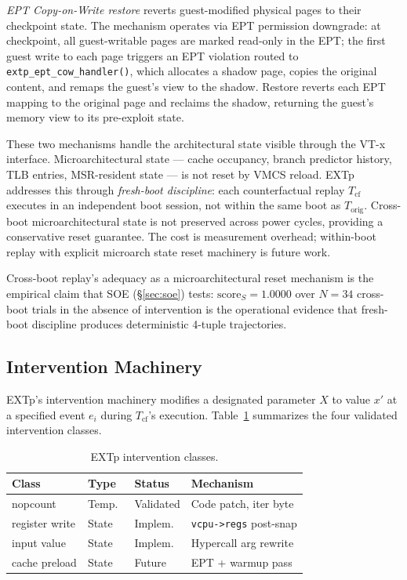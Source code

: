 \documentclass[conference]{IEEEtran}
\newcommand{\Korig}{T_\text{orig}}
\newcommand{\Tcf}{T_\text{cf}}
\newcommand{\scoreS}{\text{score}_S}
\begin{document}
\emph{EPT Copy-on-Write restore} reverts guest-modified physical
pages to their checkpoint state. The mechanism operates via EPT
permission downgrade: at checkpoint, all guest-writable pages are
marked read-only in the EPT; the first guest write to each page
triggers an EPT violation routed to
\texttt{extp\_ept\_cow\_handler()}, which allocates a shadow page,
copies the original content, and remaps the guest's view to the
shadow. Restore reverts each EPT mapping to the original page and
reclaims the shadow, returning the guest's memory view to its
pre-exploit state.

These two mechanisms handle the architectural state visible through
the VT-x interface. Microarchitectural state --- cache occupancy,
branch predictor history, TLB entries, MSR-resident state --- is not
reset by VMCS reload. EXTp addresses this through \emph{fresh-boot
discipline}: each counterfactual replay $\Tcf$ executes in an
independent boot session, not within the same boot as $\Korig$.
Cross-boot microarchitectural state is not preserved across power
cycles, providing a conservative reset guarantee. The cost is
measurement overhead; within-boot replay with explicit microarch
state reset machinery is future work.

Cross-boot replay's adequacy as a microarchitectural reset mechanism
is the empirical claim that SOE (\S\ref{sec:soe}) tests:
$\scoreS = 1.0000$ over $N{=}34$ cross-boot trials in the absence of
intervention is the operational evidence that fresh-boot discipline
produces deterministic 4-tuple trajectories.

\subsection{Intervention Machinery}\label{sec:intervention}

EXTp's intervention machinery modifies a designated parameter $X$ to
value $x'$ at a specified event $e_i$ during $\Tcf$'s execution.
Table~\ref{tab:interventions} summarizes the four validated
intervention classes.

\begin{table}[tb]
  \caption{EXTp intervention classes.}
  \label{tab:interventions}
  \centering
  \small
  \begin{tabular}{@{}p{}p{}p{}p{}@{}}
  \toprule
  Class & Type & Status & Mechanism \\
  \midrule
  nopcount       & Temp.\ & Validated   & Code patch, iter byte \\
  register write & State  & Implem.\    & \texttt{vcpu->regs} post-snap \\
  input value    & State  & Implem.\    & Hypercall arg rewrite \\
  cache preload  & State  & Future      & EPT + warmup pass \\
  \bottomrule
  \end{tabular}
\end{table}
\end{document}
